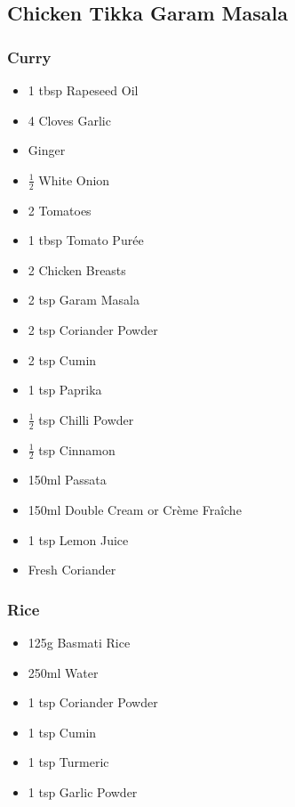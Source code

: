 \documentclass[11pt, english]{article}
\begin{document}
\newpage

	\subsection{Chicken Tikka Garam Masala}

		\subsubsection*{Curry}

	\begin{itemize}
        \setlength\itemsep{0cm}
                \item 1 tbsp Rapeseed Oil
		\item 4 Cloves Garlic
		\item Ginger
		\item $\frac{1}{2}$ White Onion
		\item 2 Tomatoes
		\item 1 tbsp Tomato Pur\'{e}e
		\item 2 Chicken Breasts
		\item 2 tsp Garam Masala
		\item 2 tsp Coriander Powder
		\item 2 tsp Cumin
		\item 1 tsp Paprika
		\item $\frac{1}{2}$ tsp Chilli Powder
		\item $\frac{1}{2}$ tsp Cinnamon
		\item 150ml Passata
		\item 150ml Double Cream or Cr\`{e}me Fra\^{i}che
		\item 1 tsp Lemon Juice
		\item Fresh Coriander
        \end{itemize}

		\subsubsection*{Rice}

	\begin{itemize}
	\setlength\itemsep{0cm}
		\item 125g Basmati Rice
		\item 250ml Water
		\item 1 tsp Coriander Powder
		\item 1 tsp Cumin
		\item 1 tsp Turmeric
		\item 1 tsp Garlic Powder
	\end{itemize}
\end{document}
